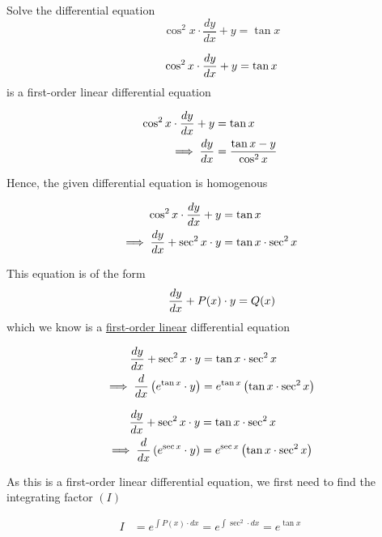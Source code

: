 \documentclass[14pt,fleqn]{extarticle}
\newcommand\intgf{e^{\tan x}}
\newcommand\expa{\tan x\cdot\sec^2 x}
\begin{document}
\begin{problem}
\statement
	
Solve the differential equation 
\[ \qquad \cos^2 x\cdot \frac{dy}{dx} + y = \tan x \]
%

\begin{step}
  \begin{options} 
     \correct 
     \[ \qquad \cos^2 x\cdot \frac{dy}{dx} + y = \tan  x\]
     is a first-order linear differential equation        
     \incorrect
        
        \begin{align}
	\cos^2 x\cdot\frac{dy}{dx} + y &= \tan x \\ 
	\implies \frac{dy}{dx} &= \dfrac{\tan x - y}{\cos^2 x} 
\end{align}

Hence, the given differential equation is homogenous
    \end{options} 
     \reason 
     
     \begin{align}
	\cos^2 x\cdot\dydx + y &= \tan x \\
	\implies \dydx + \sec^2 x\cdot y &= \expa 
\end{align}  

This equation is of the form 
\[ \qquad \frac{dy}{dx} + P(x)\cdot y = Q(x) \]
which we know is a \underline{first-order linear} differential equation
\end{step}


\begin{step}
  \begin{options} 
     \correct 
       \begin{align}
	\dydx + \sec^2x\cdot y &= \tan x\cdot\sec^2 x \\
	\implies \ddx \left(\intgf\cdot y \right) &= \intgf \left(\expa \right)
\end{align}
     \incorrect
        
        \begin{align}
	\dydx + \sec^2x\cdot y &= \tan x\cdot\sec^2 x \\
	\implies \ddx \left(e^{\sec x}\cdot y \right) &= e^{\sec x} \left(\expa \right)
\end{align}
    \end{options} 
     \reason 
     
     As this is a first-order linear differential equation, we first need to find the integrating factor $(I)$\newline 
     
     \begin{align}
     I &= e^{\int P(x)\cdot dx} = e^{\int \sec^2\cdot dx} = \intgf 
\end{align}


\end{step}
\end{problem}
\end{document}

